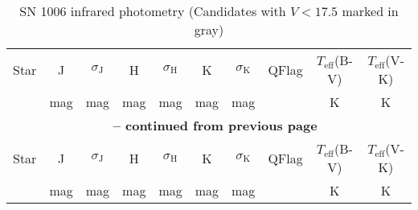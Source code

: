 \begin{longtable}{cccccccccc}
\caption{SN 1006 infrared photometry (Candidates with $V<17.5$ marked in gray)}
\label{tab:sn1006_twomass}\\ 
\hline\multicolumn{1}{c}{Star} & \multicolumn{1}{c}{J} & \multicolumn{1}{c}{$\sigma_\textrm{J}$} & \multicolumn{1}{c}{H} & \multicolumn{1}{c}{$\sigma_\textrm{H}$} & \multicolumn{1}{c}{K} & \multicolumn{1}{c}{$\sigma_\textrm{K}$} & \multicolumn{1}{c}{QFlag} & \multicolumn{1}{c}{$T_\textrm{eff}$(B-V)} & \multicolumn{1}{c}{$T_\textrm{eff}$(V-K)}\\ 
\multicolumn{1}{c}{} & \multicolumn{1}{c}{mag} & \multicolumn{1}{c}{mag} & \multicolumn{1}{c}{mag} & \multicolumn{1}{c}{mag} & \multicolumn{1}{c}{mag} & \multicolumn{1}{c}{mag} & \multicolumn{1}{c}{} & \multicolumn{1}{c}{K} & \multicolumn{1}{c}{K}\\ \hline
\endfirsthead

\multicolumn{10}{c}{{\bfseries \tablename\ \thetable{} -- continued from previous page}} \\ \hline
\multicolumn{1}{c}{Star} & \multicolumn{1}{c}{J} & \multicolumn{1}{c}{$\sigma_\textrm{J}$} & \multicolumn{1}{c}{H} & \multicolumn{1}{c}{$\sigma_\textrm{H}$} & \multicolumn{1}{c}{K} & \multicolumn{1}{c}{$\sigma_\textrm{K}$} & \multicolumn{1}{c}{QFlag} & \multicolumn{1}{c}{$T_\textrm{eff}$(B-V)} & \multicolumn{1}{c}{$T_\textrm{eff}$(V-K)}\\ 
\multicolumn{1}{c}{} & \multicolumn{1}{c}{mag} & \multicolumn{1}{c}{mag} & \multicolumn{1}{c}{mag} & \multicolumn{1}{c}{mag} & \multicolumn{1}{c}{mag} & \multicolumn{1}{c}{mag} & \multicolumn{1}{c}{} & \multicolumn{1}{c}{K} & \multicolumn{1}{c}{K}\\ \hline
\endhead


\end{longtable}
